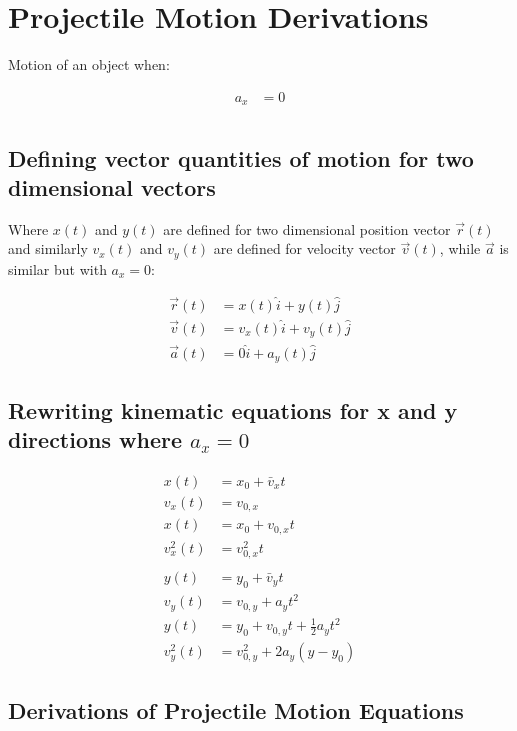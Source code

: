 \documentclass{article}
\numberwithin{equation}{section}
\begin{document}
 \section{Projectile Motion Derivations}
 Motion of an object when:
 
\[
  \begin{aligned}
    a_{x} &= 0 \\
  \end{aligned}
\]
 \subsection{Defining vector quantities of motion for two dimensional vectors}
  Where $x(t)$ and $y(t)$ are defined for two dimensional position vector
  $\vec{r}(t)$ and similarly $v_{x}(t)$ and $v_{y}(t)$ are defined for velocity
  vector $\vec{v}(t)$, while $\vec{a}$ is similar but with $a_x=0$:
  
 \[
   \begin{aligned}
    \vec{r}(t) &= x(t)\hat{i} + y(t)\hat{j} \\ 
    \vec{v}(t) &= v_x(t)\hat{i} + v_y(t)\hat{j}\\
    \vec{a}(t) &= 0\hat{i} + a_y(t)\hat{j}
   \end{aligned}
 \]
 \subsection{Rewriting kinematic equations for x and y directions where $a_x=0$}
\[
  \begin{aligned}
    x(t) &= x_{0} + \bar{v}_xt \\
    v_{x}(t) &= v_{0,x} \\
    x(t) &= x_{0} + v_{0,x} t \\ 
    v_{x}^2(t) &=  v_{0,x}^2t\\
              &\ \\
    y(t) &= y_{0} + \bar{v}_yt \\
    v_{y}(t) &= v_{0,y} + a_{y}t^2 \\
    y(t) &= y_{0} + v_{0,y} t + \frac{1}{2}a_yt^2 \\
    v_{y}^2(t) &= v_{0,y}^2 + 2a_{y}(y-y_{0}) 
  \end{aligned}
\]
 
 \subsection{Derivations of Projectile Motion Equations}
\end{document}
